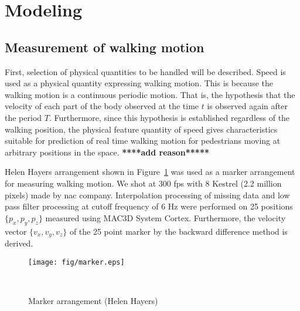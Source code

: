 \documentclass{sigchi}
\begin{document}
\section{Modeling}
\subsection{Measurement of walking motion} %
\label{subsec-nac}

First, selection of physical quantities to be handled will be described. Speed is used as a physical quantity expressing walking motion. This is because the walking motion is a continuous periodic motion. That is, the hypothesis that the velocity of each part of the body observed at the time $ t $ is observed again after the period $ T $. Furthermore, since this hypothesis is established regardless of the walking position, the physical feature quantity of speed gives characteristics suitable for prediction of real time walking motion for pedestrians moving at arbitrary positions in the space. {\bf  *****add reason*****}

Helen Hayers arrangement shown in Figure~\ref{fig:marker} was used as a marker arrangement for measuring walking motion. We shot at 300 fps with 8 Kestrel (2.2 million pixels) made by nac company. Interpolation processing of missing data and low pass filter processing at cutoff frequency of 6 Hz were performed on 25 positions $\{p_x, p_y, p_z \}$ measured using MAC3D System Cortex. Furthermore, the velocity vector $ \{v_x, v_y, v_z \} $ of the 25 point marker by the backward difference method is derived.

\begin{figure}
\centering
  \texttt{[image: fig/marker.eps]}
  \caption{Marker arrangement (Helen Hayers)}~ \label{fig:marker}
\end{figure}
\end{document}

